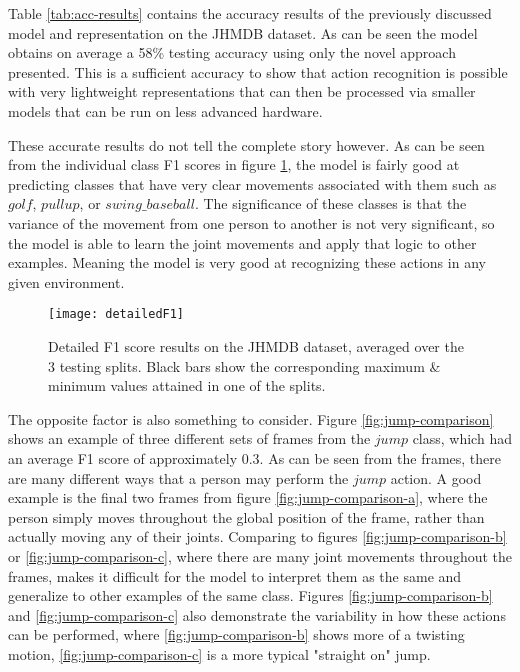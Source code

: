 Table \ref{tab:acc-results} contains the accuracy results of the previously discussed model and representation on the JHMDB dataset. As can be seen the model obtains on average a 58\% testing accuracy using only the novel approach presented. This is a sufficient accuracy to show that action recognition is possible with very lightweight representations that can then be processed via smaller models that can be run on less advanced hardware.

These accurate results do not tell the complete story however. As can be seen from the individual class F1 scores in figure \ref{fig:detailed-f1}, the model is fairly good at predicting classes that have very clear movements associated with them such as $golf$, $pullup$, or $swing\_baseball$. The significance of these classes is that the variance of the movement from one person to another is not very significant, so the model is able to learn the joint movements and apply that logic to other examples. Meaning the model is very good at recognizing these actions in any given environment.

\begin{figure}[ht]
	\texttt{[image: detailedF1]}
	\centering
	\caption{Detailed F1 score results on the JHMDB dataset, averaged over the 3 testing splits. Black bars show the corresponding maximum \& minimum values attained in one of the splits.}
	\label{fig:detailed-f1}
\end{figure}

The opposite factor is also something to consider. Figure \ref{fig:jump-comparison} shows an example of three different sets of frames from the $jump$ class, which had an average F1 score of approximately $0.3$. As can be seen from the frames, there are many different ways that a person may perform the $jump$ action. A good example is the final two frames from figure \ref{fig:jump-comparison-a}, where the person simply moves throughout the global position of the frame, rather than actually moving any of their joints. Comparing to figures \ref{fig:jump-comparison-b} or \ref{fig:jump-comparison-c}, where there are many joint movements throughout the frames, makes it difficult for the model to interpret them as the same and generalize to other examples of the same class. Figures \ref{fig:jump-comparison-b} and \ref{fig:jump-comparison-c} also demonstrate the variability in how these actions can be performed, where \ref{fig:jump-comparison-b} shows more of a twisting motion, \ref{fig:jump-comparison-c} is a more typical "straight on" jump.

